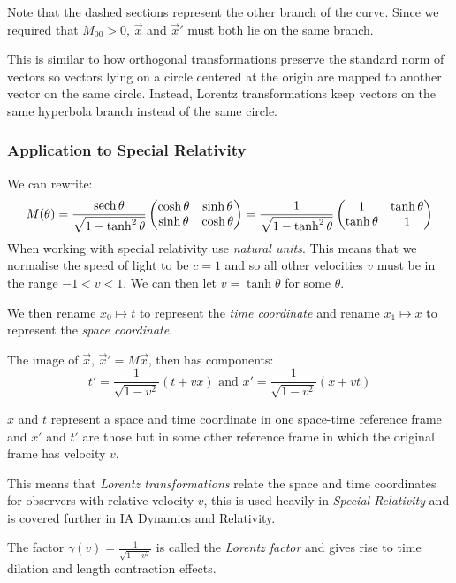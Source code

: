 \documentclass[../main.tex]{subfiles}
\begin{document}
Note that the dashed sections represent the other branch of the curve.
Since we required that $M_{0 0} > 0$, $\vec{x}$ and $\vec{x}'$ must both lie on the same branch.
\begin{remark}
  This is similar to how orthogonal transformations preserve the standard norm of vectors so vectors lying on a circle centered at the origin are mapped to another vector on the same circle.
  Instead, Lorentz transformations keep vectors on the same hyperbola branch instead of the same circle.
\end{remark}
\subsubsection{Application to Special Relativity}
We can rewrite:
\[
  M(\theta) =
  \frac{\operatorname{sech} \theta}{\sqrt{1 - \tanh^2 \theta}}
  \begin{pmatrix}
  \cosh \theta & \sinh \theta \\
  \sinh \theta  & \cosh \theta \\
  \end{pmatrix} =
  \frac{1}{\sqrt{1 - \tanh^2 \theta}} \begin{pmatrix}
  1 & \tanh \theta \\
  \tanh \theta & 1 \\
  \end{pmatrix}
\]
When working with special relativity use \textit{natural units}.
This means that we normalise the speed of light to be $c = 1$ and so all other velocities $v$ must be in the range $-1 < v < 1$.
We can then let $v = \tanh \theta$ for some $\theta$.

We then rename $x_0 \mapsto t$ to represent the \textit{time coordinate} and rename $x_1 \mapsto x$ to represent the \textit{space coordinate}.

The image of $\vec{x}$, $\vec{x}' = M\vec{x}$, then has components:
\[
  t' = \frac{1}{\sqrt{1 - v^2}}(t + vx) \text{ and } x' = \frac{1}{\sqrt{1 - v^2}}(x + vt)
\]

$x$ and $t$ represent a space and time coordinate in one space-time reference frame and $x'$ and $t'$ are those but in some other reference frame in which the original frame has velocity $v$.

This means that \textit{Lorentz transformations} relate the space and time coordinates for observers with relative velocity $v$, this is used heavily in \textit{Special Relativity} and is covered further in IA Dynamics and Relativity.

The factor $\gamma(v) = \frac{1}{\sqrt{1 - v^2}}$ is called the \textit{Lorentz factor} and gives rise to time dilation and length contraction effects.
\end{document}
